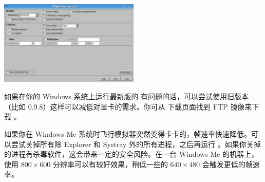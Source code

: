 \begin{center}
\includegraphics[width=0.5\textwidth]{img/tut_4}
\end{center}

\ifchinese
如果在你的 Windows 系统上运行最新版的 \FlightGear{} 有问题的话，可以尝试使用旧版本（比如 0.9.8）这样可以减低对显卡的需求。你可从 \FlightGear{} 下载页面找到 FTP 镜像来下载 。
\fi

{}

\ifchinese
如果你在 Windows Me 系统时飞行模拟器突然变得卡卡的，帧速率快速降低。可以尝试关掉所有除 Explorer 和 Systray 外的所有进程，之后再运行 \FlightGear{}。如果你关掉的进程有杀毒软件，这会带来一定的安全风险。在一台 Windows Me 的机器上，\FlightGear{} 使用 $800\times600$ 分辨率可以有较好效果，稍低一些的 $640\times480$ 会触发更低的帧速率。
\fi

